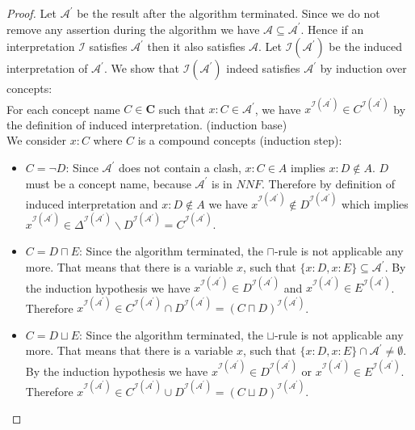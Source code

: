 \documentclass{book}
\theoremstyle{break}
\theoremstyle{definition}
\begin{document}
\begin{proof}
Let $\mathcal{A}^\prime$ be the result after the algorithm terminated. Since we do not remove any assertion during the algorithm we have $\mathcal{A}\subseteq\mathcal{A}^\prime$. Hence if an interpretation $\mathcal{I}$ satisfies $\mathcal{A}^\prime$ then it also satisfies $\mathcal{A}$. Let $\mathcal{I}(\mathcal{A}^\prime)$ be the induced interpretation of $\mathcal{A}^\prime$. We show that $\mathcal{I}(\mathcal{A}^\prime)$ indeed satisfies $\mathcal{A}^\prime$ by induction over concepts:\\
For each concept name $C\in\mathbf{C}$ such that $x:C\in\mathcal{A}^\prime$, we have $x^{\mathcal{I}(\mathcal{A}^\prime)}\in C^{\mathcal{I}(\mathcal{A}^\prime)}$ by the definition of induced interpretation. (induction base)\\
We consider $x:C$ where $C$ is a compound concepts (induction step):
\begin{itemize}
\item $C=\neg D$: Since $\mathcal{A}^\prime$ does not contain a clash, $x:C\in A$ implies $x:D\notin A$. $D$ must be a concept name, because $\mathcal{A}^\prime$ is in $NNF$. Therefore by definition of induced interpretation and $x:D\notin A$ we have $x^{\mathcal{I}(\mathcal{A}^\prime)}\notin D^{\mathcal{I}(\mathcal{A}^\prime)}$ which implies $x^{\mathcal{I}(\mathcal{A}^\prime)}\in \Delta^{\mathcal{I}(\mathcal{A}^\prime)}\backslash D^{\mathcal{I}(\mathcal{A}^\prime)}=C^{\mathcal{I}(\mathcal{A}^\prime)}$.
\item $C=D\sqcap E$: Since the algorithm terminated, the $\sqcap$-rule is not applicable any more. That means that there is a variable $x$, such that $\{x:D, x:E\}\subseteq \mathcal{A}^\prime$. By the induction hypothesis we have $x^{\mathcal{I}(\mathcal{A}^\prime)}\in D^{\mathcal{I}(\mathcal{A}^\prime)}$ and $x^{\mathcal{I}(\mathcal{A}^\prime)}\in E^{\mathcal{I}(\mathcal{A}^\prime)}$. Therefore $x^{\mathcal{I}(\mathcal{A}^\prime)}\in C^{\mathcal{I}(\mathcal{A}^\prime)}\cap D^{\mathcal{I}(\mathcal{A}^\prime)}=(C\sqcap D)^{\mathcal{I}(\mathcal{A}^\prime)}$.
\item $C=D\sqcup E$: Since the algorithm terminated, the $\sqcup$-rule is not applicable any more. That means that there is a variable $x$, such that $\{x:D, x:E\}\cap \mathcal{A}^\prime\neq \emptyset$. By the induction hypothesis we have $x^{\mathcal{I}(\mathcal{A}^\prime)}\in D^{\mathcal{I}(\mathcal{A}^\prime)}$ or $x^{\mathcal{I}(\mathcal{A}^\prime)}\in E^{\mathcal{I}(\mathcal{A}^\prime)}$. Therefore $x^{\mathcal{I}(\mathcal{A}^\prime)}\in C^{\mathcal{I}(\mathcal{A}^\prime)}\cup D^{\mathcal{I}(\mathcal{A}^\prime)}=(C\sqcup D)^{\mathcal{I}(\mathcal{A}^\prime)}$.

\end{itemize}
\end{proof}
\end{document}
